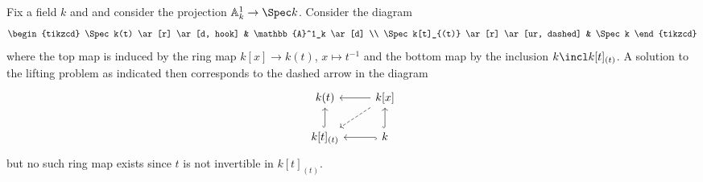 \documentclass[wip, algebra]{bsteffan-lecturenotes}
\newcommand{\A}{\mathbb{A}}
\begin{document}
\begin{example}
	Fix a field $k$ and and consider the projection $\A^1_k \to \Spec k$.
	Consider the diagram
	\begin{equation*}
		\begin{tikzcd}
			\Spec k(t)
					\ar[r]
					\ar[d, hook]
				& \A^1_k
					\ar[d]
			\\
			\Spec k[t]_{(t)}
					\ar[r]
					\ar[ur, dashed]
				& \Spec k
		\end{tikzcd}
	\end{equation*}
	where the top map is induced by the ring map $k[x] \to k(t)$, $x \mapsto t^{-1}$ and the bottom map by the inclusion $k \incl k[t]_{(t)}$.
	A solution to the lifting problem as indicated then corresponds to the dashed arrow in the diagram
	\begin{equation*}
		\begin{tikzcd}
			k(t)
				& k[x]
					\ar[l]
					\ar[dl, dashed]
			\\
			k[t]_{(t)}
					\ar[u, hook]
				& k
					\ar[l, hook]
					\ar[u, hook]
		\end{tikzcd}
	\end{equation*}
	but no such ring map exists since $t$ is not invertible in $k[t]_{(t)}$.
\end{example}

\printbibliography
\printindex
\end{document}
